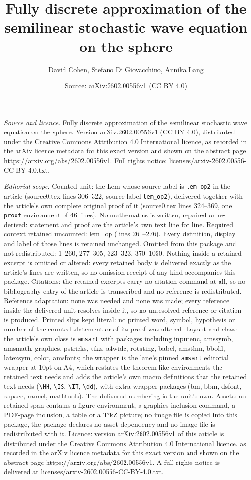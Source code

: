 \documentclass[10pt,a4paper]{amsart}
\title[Fully discrete approximation of the semilinear stochastic wa]{Fully discrete approximation of the semilinear stochastic wave equation on the sphere}
\author{David Cohen, Stefano Di Giovacchino, Annika Lang}
\date{Source: arXiv:2602.00556v1 (CC BY 4.0)}
\begin{document}
\maketitle

\noindent\emph{Source and licence.} Fully discrete approximation of the semilinear stochastic wave equation on the sphere. Version arXiv:2602.00556v1 (CC BY 4.0), distributed under the Creative Commons Attribution 4.0 International licence, as recorded in the arXiv licence metadata for this exact version and shown on the abstract page https://arxiv.org/abs/2602.00556v1. Full rights notice: licenses/arxiv-2602.00556-CC-BY-4.0.txt.\par\smallskip

\noindent\textit{Editorial scope.} Counted unit: the Lem whose source label is \texttt{lem\_op2} in the article (source0.tex lines 306--322, source label \texttt{lem\_op2}), delivered together with the article's own complete original proof of it (source0.tex lines 324--369, one \texttt{proof} environment of 46 lines). No mathematics is written, repaired or re-derived: statement and proof are the article's own text line for line. Required context retained uncounted: lem\_op (lines 261--276). Every definition, display and label of those lines is retained unchanged. Omitted from this package and not redistributed: 1--260, 277--305, 323--323, 370--1050. Nothing inside a retained excerpt is omitted or altered: every retained body is delivered exactly as the article's lines are written, so no omission receipt of any kind accompanies this package. Citations: the retained excerpts carry no citation command at all, so no bibliography entry of the article is transcribed and no reference is redistributed. Reference adaptation: none was needed and none was made; every reference inside the delivered unit resolves inside it, so no unresolved reference or citation is produced. Printed slips kept literal: no printed word, symbol, hypothesis or number of the counted statement or of its proof was altered. Layout and class: the article's own class is \texttt{amsart} with packages including inputenc, amssymb, amsmath, graphics, pstricks, tikz, a4wide, rotating, babel, amsthm, bbold, latexsym, color, amsfonts; the wrapper is the lane's pinned \texttt{amsart} editorial wrapper at 10pt on A4, which restates the theorem-like environments the retained text needs and adds the article's own macro definitions that the retained text needs (\texttt{\textbackslash HH}, \texttt{\textbackslash IS}, \texttt{\textbackslash IT}, \texttt{\textbackslash dd}), with extra wrapper packages (bm, bbm, dsfont, xspace, cancel, mathtools). The delivered numbering is the unit's own. Assets: no retained span contains a figure environment, a graphics-inclusion command, a PDF-page inclusion, a table or a TikZ picture; no image file is copied into this package, the package declares no asset dependency and no image file is redistributed with it. Licence: version arXiv:2602.00556v1 of this article is distributed under the Creative Commons Attribution 4.0 International licence, as recorded in the arXiv licence metadata for this exact version and shown on the abstract page https://arxiv.org/abs/2602.00556v1. A full rights notice is delivered at licenses/arxiv-2602.00556-CC-BY-4.0.txt. 
\end{document}
